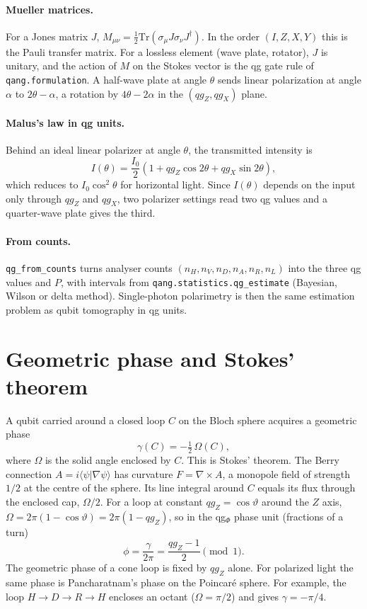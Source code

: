 \documentclass[11pt]{article}
\begin{document}
\paragraph{Mueller matrices.} For a Jones matrix $J$, $M_{\mu\nu}=\tfrac12\mathrm{Tr}(\sigma_\mu J\sigma_\nu
J^\dagger)$. In the order $(I,Z,X,Y)$ this is the Pauli transfer matrix. For a lossless element (wave plate,
rotator), $J$ is unitary, and the action of $M$ on the Stokes vector is the qg gate rule of
\texttt{qang.formulation}. A half-wave plate at angle $\theta$ sends linear polarization at angle $\alpha$ to
$2\theta-\alpha$, a rotation by $4\theta-2\alpha$ in the $(qg_Z,qg_X)$ plane.

\paragraph{Malus's law in qg units.} Behind an ideal linear polarizer at angle $\theta$, the transmitted
intensity is
\begin{equation}
I(\theta)=\frac{I_0}{2}\left(1+qg_Z\cos2\theta+qg_X\sin2\theta\right),
\end{equation}
which reduces to $I_0\cos^2\theta$ for horizontal light. Since $I(\theta)$ depends on the input only through
$qg_Z$ and $qg_X$, two polarizer settings read two qg values and a quarter-wave plate gives the third.

\paragraph{From counts.} \texttt{qg\_from\_counts} turns analyser counts $(n_H,n_V,n_D,n_A,n_R,n_L)$ into the three
qg values and $P$, with intervals from \texttt{qang.statistics.qg\_estimate} (Bayesian, Wilson or delta method).
Single-photon polarimetry is then the same estimation problem as qubit tomography in qg units.

\section{Geometric phase and Stokes' theorem}

A qubit carried around a closed loop $C$ on the Bloch sphere acquires a geometric
phase~\cite{pancharatnam1956,berry1984}
\begin{equation}
\gamma(C)=-\tfrac12\,\Omega(C),
\end{equation}
where $\Omega$ is the solid angle enclosed by $C$. This is Stokes' theorem. The Berry connection
$A=i\langle\psi|\nabla\psi\rangle$ has curvature $F=\nabla\times A$, a monopole field of strength $1/2$ at the
centre of the sphere. Its line integral around $C$ equals its flux through the enclosed cap, $\Omega/2$. For a
loop at constant $qg_Z=\cos\vartheta$ around the $Z$ axis, $\Omega=2\pi(1-\cos\vartheta)=2\pi(1-qg_Z)$, so in the
qg$_\Phi$ phase unit (fractions of a turn)
\begin{equation}
\phi=\frac{\gamma}{2\pi}=\frac{qg_Z-1}{2}\pmod 1 .
\end{equation}
The geometric phase of a cone loop is fixed by $qg_Z$ alone. For polarized light the same phase is Pancharatnam's
phase on the Poincar\'e sphere. For example, the loop $H\to D\to R\to H$ encloses an octant ($\Omega=\pi/2$) and
gives $\gamma=-\pi/4$.
\end{document}
